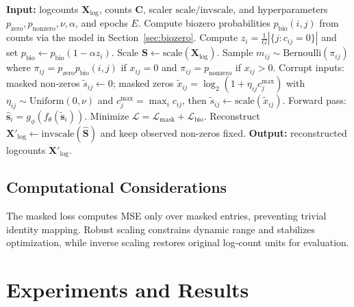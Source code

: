 \documentclass{article}
\theoremstyle{plain}
\theoremstyle{definition}
\theoremstyle{remark}
\begin{document}
\begin{algorithm}[H]
\caption{MaskClass training and imputation.}
\label{alg:maskclass}
\begin{algorithmic}[1]
\raggedright
\STATE \textbf{Input:} logcounts $\mathbf{X}_{\log}$, counts $\mathbf{C}$,
scaler $\mathrm{scale}/\mathrm{invscale}$, and hyperparameters
$p_{\mathrm{zero}},p_{\mathrm{nonzero}},\nu,\alpha$, and epochs $E$.
\STATE Compute biozero probabilities $p_{\mathrm{bio}}(i,j)$ from counts
via the model in Section~\ref{sec:biozero}.
\STATE Compute $z_i=\frac{1}{G}\left|\{j: c_{ij}=0\}\right|$ and set
$p_{\mathrm{bio}}\leftarrow p_{\mathrm{bio}}(1-\alpha z_i)$.
\STATE Scale $\mathbf{S}\leftarrow\mathrm{scale}(\mathbf{X}_{\log})$.
\STATE Sample $m_{ij}\sim\mathrm{Bernoulli}(\pi_{ij})$ where
$\pi_{ij}=p_{\mathrm{zero}}p_{\mathrm{bio}}(i,j)$ if $x_{ij}=0$ and
$\pi_{ij}=p_{\mathrm{nonzero}}$ if $x_{ij}>0$.
\STATE Corrupt inputs:
masked non-zeros $\tilde{s}_{ij}\leftarrow 0$; masked zeros
$\tilde{x}_{ij}=\log_2(1+\eta_{ij}c^{\max}_j)$ with
$\eta_{ij}\sim\mathrm{Uniform}(0,\nu)$ and $c^{\max}_j=\max_i c_{ij}$, then
$\tilde{s}_{ij}\leftarrow\mathrm{scale}(\tilde{x}_{ij})$.
\STATE Forward pass: $\hat{\mathbf{s}}_i=g_\phi(f_\theta(\tilde{\mathbf{s}}_i))$.
\STATE Minimize $\mathcal{L}=\mathcal{L}_{\mathrm{mask}}+\mathcal{L}_{\mathrm{bio}}$.
\ENDFOR
\ENDFOR
\STATE Reconstruct $\mathbf{X}'_{\log}\leftarrow\mathrm{invscale}(\hat{\mathbf{S}})$ and keep observed non-zeros fixed.
\STATE \textbf{Output:} reconstructed logcounts $\mathbf{X}'_{\log}$.
\end{algorithmic}
\end{algorithm}
\FloatBarrier

  \subsection{Computational Considerations}
  The masked loss computes MSE only over masked entries, preventing trivial
  identity mapping. Robust scaling constrains dynamic range and stabilizes
  optimization, while inverse scaling restores original log‑count units for
  evaluation.

\section{Experiments and Results}
\label{sec:experiments}
\end{document}
